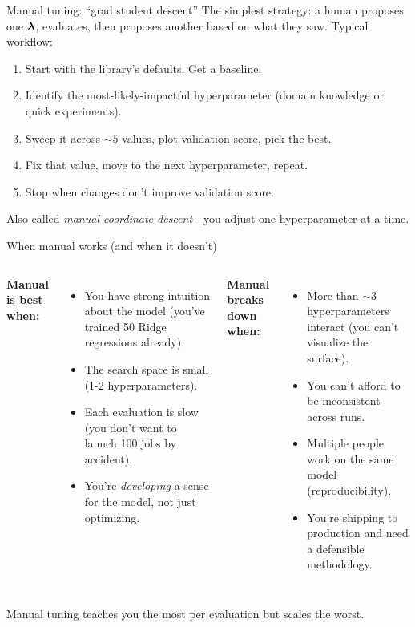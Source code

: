 \documentclass[aspectratio=169]{beamer}
\begin{document}
\begin{frame}{Manual tuning: ``grad student descent''}
  The simplest strategy: a human proposes one $\bm{\lambda}$, evaluates, then proposes another based on what they saw.
  \vfill
  Typical workflow:
  \begin{enumerate}
    \item Start with the library's defaults. Get a baseline.
    \item Identify the most-likely-impactful hyperparameter (domain knowledge or quick experiments).
    \item Sweep it across $\sim 5$ values, plot validation score, pick the best.
    \item Fix that value, move to the next hyperparameter, repeat.
    \item Stop when changes don't improve validation score.
  \end{enumerate}
  \vfill
  Also called \emph{manual coordinate descent} - you adjust one hyperparameter at a time.
\end{frame}

\begin{frame}{When manual works (and when it doesn't)}
  \begin{columns}[T]
    \textbf{Manual is best when:}
    \begin{itemize}\small
      \item You have strong intuition about the model (you've trained 50 Ridge regressions already).
      \item The search space is small (1-2 hyperparameters).
      \item Each evaluation is slow (you don't want to launch 100 jobs by accident).
      \item You're \emph{developing} a sense for the model, not just optimizing.
    \end{itemize}
    \textbf{Manual breaks down when:}
    \begin{itemize}\small
      \item More than $\sim 3$ hyperparameters interact (you can't visualize the surface).
      \item You can't afford to be inconsistent across runs.
      \item Multiple people work on the same model (reproducibility).
      \item You're shipping to production and need a defensible methodology.
    \end{itemize}
  \end{columns}
  \vfill
  Manual tuning teaches you the most per evaluation but scales the worst.
\end{frame}
\end{document}

